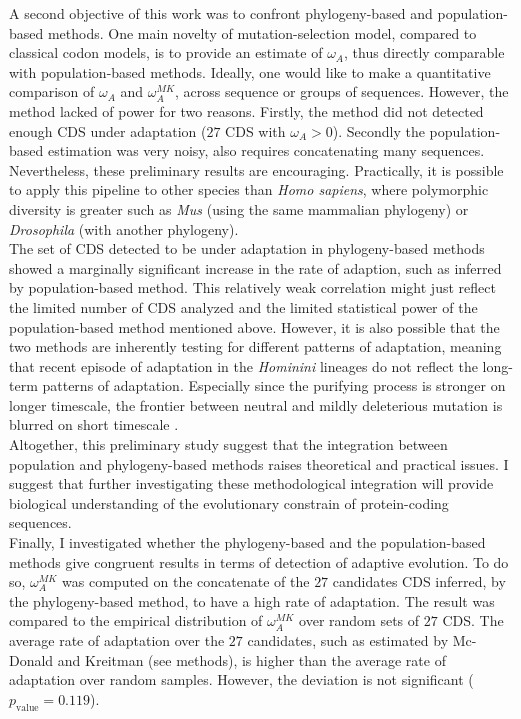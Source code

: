 A second objective of this work was to confront phylogeny-based and population-based methods. One main novelty of mutation-selection model, compared to classical \gls{codon} models, is to provide an estimate of $\omega_A$, thus directly comparable with population-based methods. Ideally, one would like to make a quantitative comparison of $\omega_A$ and $\omega_A^{MK}$, across sequence or groups of sequences. However, the method lacked of power for two reasons. Firstly, the method did not detected enough CDS under adaptation ($27$ CDS with $\omega_A > 0$). Secondly the population-based estimation was very noisy, also requires concatenating many sequences. Nevertheless, these preliminary results are encouraging. Practically, it is possible to apply this pipeline to other species than \textit{Homo sapiens}, where \gls{polymorphic} diversity is greater such as \textit{Mus} (using the same mammalian phylogeny) or \textit{Drosophila} (with another phylogeny). \\

The set of CDS detected to be under adaptation in phylogeny-based methods showed a marginally significant increase in the rate of adaption, such as inferred by population-based method. This relatively weak correlation might just reflect the limited number of CDS analyzed and the limited statistical power of the population-based method mentioned above. However, it is also possible that the two methods are inherently testing for different patterns of adaptation, meaning that recent episode of adaptation in the \textit{Hominini} lineages do not reflect the long-term patterns of adaptation. Especially since the purifying process is stronger on longer timescale, the frontier between \gls{neutral} and mildly deleterious mutation is blurred on short timescale \citep{ho_time_2005}. \\

Altogether, this preliminary study suggest that the integration between population and phylogeny-based methods raises theoretical and practical issues. I suggest that further investigating these methodological integration will provide biological understanding of the evolutionary constrain of protein-coding sequences. \\

Finally, I investigated whether the phylogeny-based and the population-based methods give congruent results in terms of detection of adaptive evolution.
To do so, $\omega_A^{MK}$ was computed on the concatenate of the $27$ candidates CDS inferred, by the phylogeny-based method, to have a high rate of adaptation. The result was compared to the empirical distribution of $\omega_A^{MK}$ over random sets of $27$ CDS.
The average rate of adaptation over the $27$ candidates, such as estimated by Mc-Donald and Kreitman (see methods), is higher than the average rate of adaptation over random samples. However, the deviation is not significant ($p_{\mathrm{value}}=0.119$).\\

